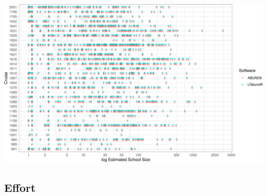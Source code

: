 \documentclass[
]{book}
\begin{document}
\includegraphics{figures/unnamed-chunk-125-1.pdf}

\hypertarget{effort}{%
\subsection*{Effort}\label{effort}}
\end{document}
